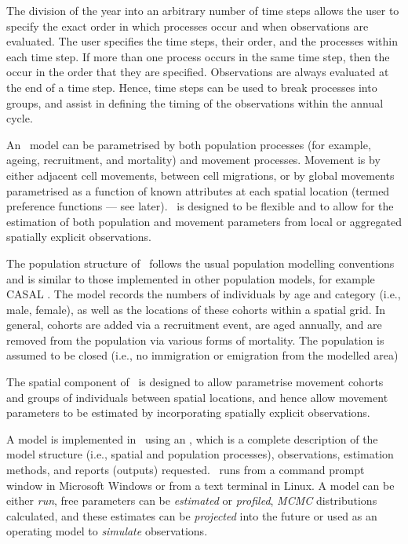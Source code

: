 The division of the year into an arbitrary number of time steps allows the user to specify the exact order in which processes occur and when observations are evaluated. The user specifies the time steps, their order, and the processes within each time step. If more than one process occurs in the same time step, then the occur in the order that they are specified. Observations are always evaluated at the end of a time step. Hence, time steps can be used to break processes into groups, and assist in defining the timing of the observations within the annual cycle. 

An \SPM\ model can be parametrised by both population processes (for example, ageing, recruitment, and mortality) and movement processes. Movement is by either adjacent cell movements, between cell migrations, or by global movements parametrised as a function of known attributes at each spatial location (termed preference functions --- see later). \SPM\ is designed to be flexible and to allow for the estimation of both population and movement parameters from local or aggregated spatially explicit observations. 

The population structure of \SPM\ follows the usual population modelling conventions and is similar to those implemented in other population models, for example CASAL \citep{1388}. The model records the numbers of individuals by age and category (i.e., male, female), as well as the locations of these cohorts within a spatial grid. In general, cohorts are added via a recruitment event, are aged annually, and are removed from the population via various forms of mortality. The population is assumed to be closed (i.e., no immigration or emigration from the modelled area)

The spatial component of \SPM\ is designed to allow parametrise movement cohorts and groups of individuals between spatial locations, and hence allow movement parameters to be estimated by incorporating spatially explicit observations. 

A model is implemented in \SPM\ using an \config {}, which is a complete description of the model structure (i.e., spatial and population processes), observations, estimation methods, and reports (outputs) requested. \SPM\ runs from a command prompt window in Microsoft Windows or from a text terminal in Linux. A model can be either \emph{run}, free parameters can be \emph{estimated} or \emph{profiled}, \emph{MCMC} distributions calculated, and these estimates can be \emph{projected} into the future or used as an operating model to \emph{simulate} observations.

